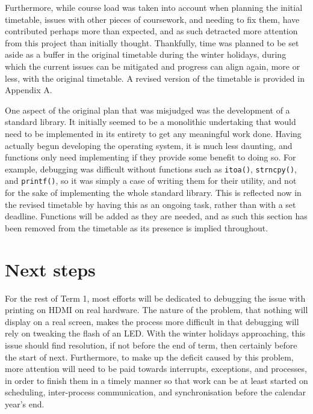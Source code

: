 \documentclass[10pt,a4paper]{article}
\newcommand{\code}[1]{\texttt{#1}}
\begin{document}
Furthermore, while course load was taken into account when planning the initial
timetable, issues with other pieces of coursework, and needing to fix them, have
contributed perhaps more than expected, and as such detracted more attention
from this project than initially thought. Thankfully, time was planned to be set
aside as a buffer in the original timetable during the winter holidays, during
which the current issues can be mitigated and progress can align again, more or
less, with the original timetable. A revised version of the timetable is
provided in Appendix A.

One aspect of the original plan that was misjudged was the development of a
standard library. It initially seemed to be a monolithic undertaking that would
need to be implemented in its entirety to get any meaningful work done. Having
actually begun developing the operating system, it is much less daunting, and
functions only need implementing if they provide some benefit to doing so. For
example, debugging was difficult without functions such as \code{itoa()},
\code{strncpy()}, and \code{printf()}, so it was simply a case of writing them
for their utility, and not for the sake of implementing the whole standard
library. This is reflected now in the revised timetable by having this as an
ongoing task, rather than with a set deadline. Functions will be added as they
are needed, and as such this section has been removed from the timetable as its
presence is implied throughout.


\section*{Next steps}
For the rest of Term 1, most efforts will be dedicated to debugging the issue
with printing on HDMI on real hardware. The nature of the problem, that nothing
will display on a real screen, makes the process more difficult in that
debugging will rely on tweaking the flash of an LED. With the winter holidays
approaching, this issue should find resolution, if not before the end of term,
then certainly before the start of next. Furthermore, to make up the deficit
caused by this problem, more attention will need to be paid towards interrupts,
exceptions, and processes, in order to finish them in a timely manner so that
work can be at least started on scheduling, inter-process communication, and
synchronisation before the calendar year's end.
\end{document}
